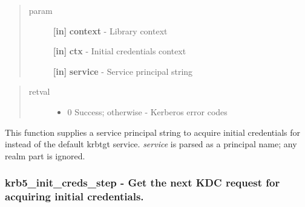 \documentclass[letterpaper,10pt,english]{sphinxmanual}
\begin{document}
\begin{quote}\begin{description}
\item[{param}] \leavevmode
\textbf{{[}in{]}} \textbf{context} - Library context

\textbf{{[}in{]}} \textbf{ctx} - Initial credentials context

\textbf{{[}in{]}} \textbf{service} - Service principal string

\end{description}\end{quote}
\begin{quote}\begin{description}
\item[{retval}] \leavevmode\begin{itemize}
\item {} 
0   Success; otherwise - Kerberos error codes

\end{itemize}

\end{description}\end{quote}

This function supplies a service principal string to acquire initial credentials for instead of the default krbtgt service. \emph{service} is parsed as a principal name; any realm part is ignored.


\subsubsection{krb5\_init\_creds\_step -  Get the next KDC request for acquiring initial credentials.}
\label{appdev/refs/api/krb5_init_creds_step::doc}\label{appdev/refs/api/krb5_init_creds_step:krb5-init-creds-step-get-the-next-kdc-request-for-acquiring-initial-credentials}

\begin{fulllineitems}
\label{appdev/refs/api/krb5_init_creds_step:krb5_init_creds_step}
\end{fulllineitems}
\end{document}
